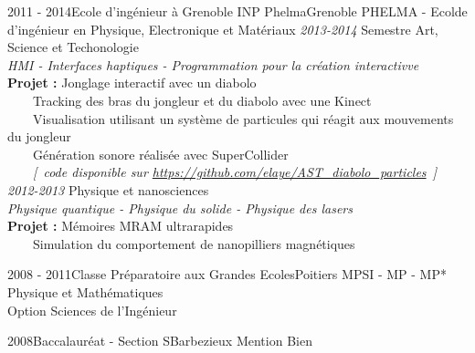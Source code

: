 \documentclass[a4paper]{genard-cv}
\begin{document}
\begin{body}
	\education
		\begin{entry}
			{2011 - 2014}{Ecole d'ingénieur à Grenoble INP Phelma}{Grenoble}
			{PHELMA - Ecolde d'ingénieur en Physique, Electronique et Matériaux}
			\textit{2013-2014} Semestre Art, Science et Techonologie\\
			\textit{HMI - Interfaces haptiques - Programmation pour la création interactivve}\\
			\textbf{Projet :} Jonglage interactif avec un diabolo\\
			~~~~Tracking des bras du jongleur et du diabolo avec une Kinect\\
			~~~~Visualisation utilisant un système de particules qui réagit aux mouvements du jongleur\\
			~~~~Génération sonore réalisée avec SuperCollider\\
			~~~~{\itshape [~code disponible sur \href{https://github.com/elaye/AST\_diabolo\_particles}{https://github.com/elaye/AST\_diabolo\_particles}~]}
			\medskip\\

			\textit{2012-2013} Physique et nanosciences\\
			\textit{Physique quantique - Physique du solide - Physique des lasers}\\
			\textbf{Projet :} Mémoires MRAM ultrarapides\\
			~~~~Simulation du comportement de nanopilliers magnétiques
			\medskip\\

		\end{entry}
		\begin{entry}
			{2008 - 2011}{Classe Préparatoire aux Grandes Ecoles}{Poitiers}
			{MPSI - MP - MP*}
			Physique et Mathématiques\\
			Option Sciences de l'Ingénieur
		\end{entry}
		\begin{entry}
			{2008}{Baccalauréat - Section S}{Barbezieux}
			{Mention Bien}
		\end{entry}

\end{body}
\end{document}
